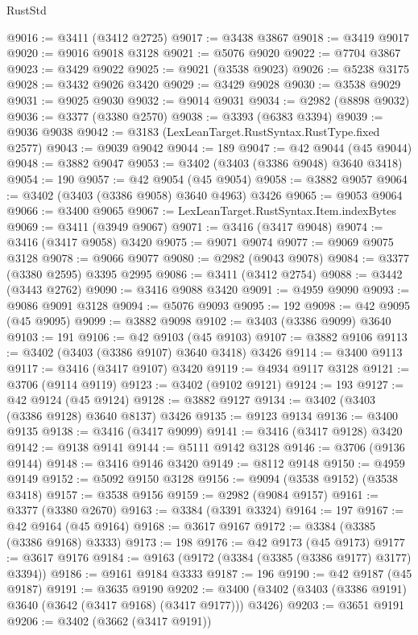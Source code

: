 \begin{lexlean}{RustStd}
\begin{coremodule}
@9016 := @3411 (@3412 @2725)
@9017 := @3438 @3867
@9018 := @3419 @9017
@9020 := @9016 @9018 @3128
@9021 := @5076 @9020
@9022 := @7704 @3867
@9023 := @3429 @9022
@9025 := @9021 (@3538 @9023)
@9026 := @5238 @3175
@9028 := @3432 @9026 @3420
@9029 := @3429 @9028
@9030 := @3538 @9029
@9031 := @9025 @9030
@9032 := @9014 @9031
@9034 := @2982 (@8898 @9032)
@9036 := @3377 (@3380 @2570)
@9038 := @3393 (@6383 @3394)
@9039 := @9036 @9038
@9042 := @3183 (LexLeanTarget.RustSyntax.RustType.fixed @2577)
@9043 := @9039 @9042
@9044 := 189
@9047 := @42 @9044 (@45 @9044)
@9048 := @3882 @9047
@9053 := @3402 (@3403 (@3386 @9048) @3640 @3418)
@9054 := 190
@9057 := @42 @9054 (@45 @9054)
@9058 := @3882 @9057
@9064 := @3402 (@3403 (@3386 @9058) @3640 @4963) @3426
@9065 := @9053 @9064
@9066 := @3400 @9065
@9067 := LexLeanTarget.RustSyntax.Item.indexBytes
@9069 := @3411 (@3949 @9067)
@9071 := @3416 (@3417 @9048)
@9074 := @3416 (@3417 @9058) @3420
@9075 := @9071 @9074
@9077 := @9069 @9075 @3128
@9078 := @9066 @9077
@9080 := @2982 (@9043 @9078)
@9084 := @3377 (@3380 @2595) @3395 @2995
@9086 := @3411 (@3412 @2754)
@9088 := @3442 (@3443 @2762)
@9090 := @3416 @9088 @3420
@9091 := @4959 @9090
@9093 := @9086 @9091 @3128
@9094 := @5076 @9093
@9095 := 192
@9098 := @42 @9095 (@45 @9095)
@9099 := @3882 @9098
@9102 := @3403 (@3386 @9099) @3640
@9103 := 191
@9106 := @42 @9103 (@45 @9103)
@9107 := @3882 @9106
@9113 := @3402 (@3403 (@3386 @9107) @3640 @3418) @3426
@9114 := @3400 @9113
@9117 := @3416 (@3417 @9107) @3420
@9119 := @4934 @9117 @3128
@9121 := @3706 (@9114 @9119)
@9123 := @3402 (@9102 @9121)
@9124 := 193
@9127 := @42 @9124 (@45 @9124)
@9128 := @3882 @9127
@9134 := @3402 (@3403 (@3386 @9128) @3640 @8137) @3426
@9135 := @9123 @9134
@9136 := @3400 @9135
@9138 := @3416 (@3417 @9099)
@9141 := @3416 (@3417 @9128) @3420
@9142 := @9138 @9141
@9144 := @5111 @9142 @3128
@9146 := @3706 (@9136 @9144)
@9148 := @3416 @9146 @3420
@9149 := @8112 @9148
@9150 := @4959 @9149
@9152 := @5092 @9150 @3128
@9156 := @9094 (@3538 @9152) (@3538 @3418)
@9157 := @3538 @9156
@9159 := @2982 (@9084 @9157)
@9161 := @3377 (@3380 @2670)
@9163 := @3384 (@3391 @3324)
@9164 := 197
@9167 := @42 @9164 (@45 @9164)
@9168 := @3617 @9167
@9172 := @3384 (@3385 (@3386 @9168) @3333)
@9173 := 198
@9176 := @42 @9173 (@45 @9173)
@9177 := @3617 @9176
@9184 := @9163 (@9172 (@3384 (@3385 (@3386 @9177) @3177) @3394))
@9186 := @9161 @9184 @3333
@9187 := 196
@9190 := @42 @9187 (@45 @9187)
@9191 := @3635 @9190
@9202 := @3400 (@3402 (@3403 (@3386 @9191) @3640 (@3642 (@3417 @9168) (@3417 @9177))) @3426)
@9203 := @3651 @9191
@9206 := @3402 (@3662 (@3417 @9191))

\end{coremodule}
\end{lexlean}
